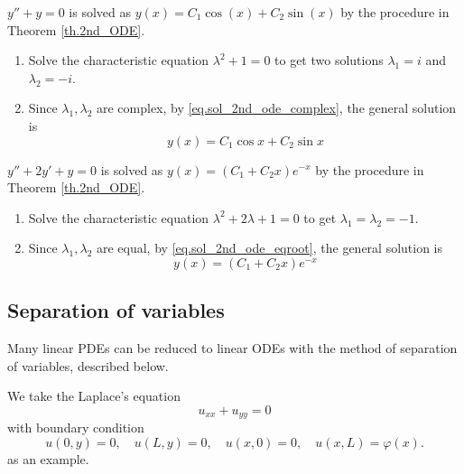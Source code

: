 \begin{example}[]
    $y'' + y = 0$ is solved as $y(x)=C_1\cos(x)+C_2\sin(x)$ by the procedure in Theorem \ref{th.2nd_ODE}.
    \begin{enumerate}
        \item Solve the characteristic equation $\lambda^2 + 1 = 0$ to get two solutions $\lambda_1 = i$ and $\lambda_2 = -i$.
        \item Since $\lambda_1,\lambda_2$ are complex, by \eqref{eq.sol_2nd_ode_complex}, the general solution is 
        \begin{equation}
            y(x)=C_1 \cos x + C_2 \sin x
        \end{equation}
    \end{enumerate}
\end{example}

\begin{example}[]
    $y'' + 2y' + y = 0$ is solved as $y(x)=(C_1+C_2x)e^{-x}$ by the procedure in Theorem \ref{th.2nd_ODE}.
    \begin{enumerate}
        \item Solve the characteristic equation $\lambda^2 + 2\lambda + 1 = 0$ to get $\lambda_1 = \lambda_2 = -1$.
        \item Since $\lambda_1,\lambda_2$ are equal, by \eqref{eq.sol_2nd_ode_eqroot}, the general solution is 
        \begin{equation}
            y(x)=(C_1+C_2x)e^{-x}
        \end{equation}
    \end{enumerate}
\end{example}


\subsection{Separation of variables}
Many linear PDEs can be reduced to linear ODEs with the method of separation of
variables, described below.

We take the Laplace's equation
\begin{equation}\label{eq.Laplace}
    u_{x x}+u_{y y}=0
\end{equation}
with boundary condition
\begin{equation}\label{eq.Laplace_boundary}
    u(0, y)=0, \quad u(L, y)=0, \quad u(x, 0)=0, \quad u(x, L)=\varphi(x).
\end{equation}
as an example.

